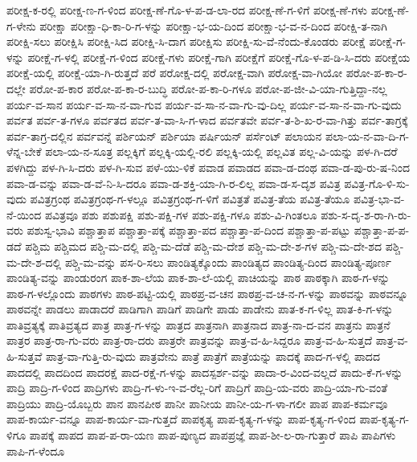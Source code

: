 {ಪರೀಕ್ಷ-ಕ-ರಲ್ಲಿ
ಪರೀಕ್ಷ-ಣ-ಗ-ಳಿಂದ
ಪರೀಕ್ಷ-ಣೆ-ಗೊ-ಳ-ಪ-ಡ-ಲಾ-ರದ
ಪರೀಕ್ಷ-ಣೆ-ಗ-ಳಿಗೆ
ಪರೀಕ್ಷ-ಣೆ-ಗಳು
ಪರೀಕ್ಷ-ಣೆ-ಗ-ಳೇನು
ಪರೀಕ್ಷಾ
ಪರೀಕ್ಷಾ-ಧಿ-ಕಾ-ರಿ-ಗ-ಳನ್ನು
ಪರೀಕ್ಷಾ-ಭ-ಯ-ದಿಂದ
ಪರೀಕ್ಷಾ-ಭ-ವ-ನ-ದಿಂದ
ಪರೀಕ್ಷಿ-ತ-ನಾಗಿ
ಪರೀಕ್ಷಿ-ಸಲು
ಪರೀಕ್ಷಿಸಿ
ಪರೀಕ್ಷಿ-ಸಿದ
ಪರೀಕ್ಷಿ-ಸಿ-ದಾಗ
ಪರೀಕ್ಷಿಸು
ಪರೀಕ್ಷಿ-ಸು-ವೆ-ನೆಂದು-ಕೊಂಡರು
ಪರೀಕ್ಷೆ
ಪರೀಕ್ಷೆ-ಗ-ಳನ್ನು
ಪರೀಕ್ಷೆ-ಗ-ಳಲ್ಲಿ
ಪರೀಕ್ಷೆ-ಗ-ಳಿಂದ
ಪರೀಕ್ಷೆ-ಗಳು
ಪರೀಕ್ಷೆ-ಗಾಗಿ
ಪರೀಕ್ಷೆಗೆ
ಪರೀಕ್ಷೆ-ಗೊ-ಳ-ಪ-ಡಿ-ಸಿ-ದರು
ಪರೀಕ್ಷೆಯ
ಪರೀಕ್ಷೆ-ಯಲ್ಲಿ
ಪರೀಕ್ಷೆ-ಯಾ-ಗಿ-ರುತ್ತದೆ
ಪರೆ
ಪರೋಕ್ಷ-ದಲ್ಲಿ
ಪರೋಕ್ಷ-ವಾಗಿ
ಪರೋಕ್ಷ-ವಾ-ಗಿಯೋ
ಪರೋ-ಪ-ಕಾ-ರ-ದಲ್ಲೇ
ಪರೋ-ಪ-ಕಾರ
ಪರೋ-ಪ-ಕಾ-ರ-ಬುದ್ಧಿ
ಪರೋ-ಪ-ಕಾ-ರಿ-ಗಳೂ
ಪರೋ-ಪ-ಜೀ-ವಿ-ಯಾ-ಗುತ್ತಿದ್ದಾ-ನಲ್ಲ
ಪರ್ಯ-ವ-ಸಾನ
ಪರ್ಯ-ವ-ಸಾ-ನ-ವಾ-ಗುವ
ಪರ್ಯ-ವ-ಸಾ-ನ-ವಾ-ಗು-ವು-ದಿಲ್ಲ
ಪರ್ಯ-ವ-ಸಾ-ನ-ವಾ-ಗು-ವುದು
ಪರ್ವತ
ಪರ್ವ-ತ-ಗಳೂ
ಪರ್ವತದ
ಪರ್ವ-ತ-ವಾ-ಸಿ-ಗ-ಳಾದ
ಪರ್ವತವೇ
ಪರ್ವ-ತ-ಶಿ-ಖ-ರ-ವಾ-ಗಿತ್ತು
ಪರ್ವ-ತಾಗ್ರಕ್ಕೆ
ಪರ್ವ-ತಾಗ್ರ-ದಲ್ಲಿನ
ಪರ್ವವನ್ನೆ
ಪರ್ಶಿಯನ್
ಪರ್ಶಿಯಾ
ಪರ್ಷಿಯನ್
ಪರ್ಸೆಂಟ್
ಪಲಾಯನ
ಪಲಾ-ಯ-ನ-ವಾ-ದಿ-ಗ-ಳೆನ್ನ-ಬೇಕೆ
ಪಲಾ-ಯ-ನ-ಸೂತ್ರ
ಪಲ್ಲಕ್ಕಿಗೆ
ಪಲ್ಲಕ್ಕಿ-ಯಲ್ಲಿ-ರಲಿ
ಪಲ್ಲಕ್ಕಿ-ಯಲ್ಲಿ
ಪಲ್ಲವಿತ
ಪಲ್ಲ-ವಿ-ಯನ್ನು
ಪಳ-ಗಿ-ದರೆ
ಪಳಗಿದ್ದು
ಪಳ-ಗಿ-ಸಿ-ದರು
ಪಳ-ಗಿ-ಸುವ
ಪಳೆ-ಯು-ಳಿಕೆ
ಪವಾಡ
ಪವಾಡದ
ಪವಾ-ಡ-ದಂಥ
ಪವಾ-ಡ-ಪು-ರು-ಷ-ನಿಂದ
ಪವಾ-ಡ-ವನ್ನು
ಪವಾ-ಡ-ವೆ-ನಿ-ಸಿ-ದರೂ
ಪವಾ-ಡ-ಶಕ್ತಿ-ಯಾ-ಗಿ-ರ-ಲಿಲ್ಲ
ಪವಾ-ಡ-ಸ-ದೃಶ
ಪವಿತ್ರ
ಪವಿತ್ರ-ಗೊ-ಳಿ-ಸು-ವುದು
ಪವಿತ್ರಗ್ರಂಥ
ಪವಿತ್ರಗ್ರಂಥ-ಗ-ಳಲ್ಲೂ
ಪವಿತ್ರಗ್ರಂಥ-ಗ-ಳಿಗೆ
ಪವಿತ್ರತೆ
ಪವಿತ್ರ-ತೆಯ
ಪವಿತ್ರ-ತೆಯೂ
ಪವಿತ್ರ-ಭಾ-ವ-ನೆ-ಯಿಂದ
ಪವಿತ್ರವೂ
ಪಶು
ಪಶುಪಕ್ಷಿ
ಪಶು-ಪಕ್ಷಿ-ಗಳ
ಪಶು-ಪಕ್ಷಿ-ಗಳೂ
ಪಶು-ವಿ-ಗಿಂತಲೂ
ಪಶು-ಸ-ದೃ-ಶ-ರಾ-ಗಿ-ರು-ವರು
ಪಶುಸ್ವ-ಭಾವಿ
ಪಶ್ಚಾತ್ತಾಪ
ಪಶ್ಚಾತ್ತಾ-ಪಕ್ಕೆ
ಪಶ್ಚಾತ್ತಾ-ಪದ
ಪಶ್ಚಾತ್ತಾ-ಪ-ದಿಂದ
ಪಶ್ಚಾತ್ತಾ-ಪ-ಪಟ್ಟು
ಪಶ್ಚಾತ್ತಾ-ಪ-ಪ-ಡದೆ
ಪಶ್ಚಿಮ
ಪಶ್ಚಿಮದ
ಪಶ್ಚಿ-ಮ-ದಲ್ಲಿ
ಪಶ್ಚಿ-ಮ-ದೆಡೆ
ಪಶ್ಚಿ-ಮ-ದೇಶ
ಪಶ್ಚಿ-ಮ-ದೇ-ಶ-ಗಳ
ಪಶ್ಚಿ-ಮ-ದೇ-ಶದ
ಪಶ್ಚಿ-ಮ-ದೇ-ಶ-ದಲ್ಲಿ
ಪಶ್ಚಿ-ಮ-ವನ್ನು
ಪಸ-ರಿ-ಸಲು
ಪಾಂಡಿತ್ಯಕ್ಕೊಂದು
ಪಾಂಡಿತ್ಯದ
ಪಾಂಡಿತ್ಯ-ದಿಂದ
ಪಾಂಡಿತ್ಯ-ಪೂರ್ಣ
ಪಾಂಡಿತ್ಯ-ವನ್ನು
ಪಾಂಡುರಂಗ
ಪಾಕ-ಶಾ-ಲೆಯ
ಪಾಕ-ಶಾ-ಲೆ-ಯಲ್ಲಿ
ಪಾಚಿಯನ್ನು
ಪಾಠ
ಪಾಠಕ್ಕಾಗಿ
ಪಾಠ-ಗ-ಳನ್ನು
ಪಾಠ-ಗ-ಳಲ್ಲೊಂದು
ಪಾಠಗಳು
ಪಾಠ-ಪಟ್ಟಿ-ಯಲ್ಲಿ
ಪಾಠಪ್ರ-ವ-ಚನ
ಪಾಠಪ್ರ-ವ-ಚ-ನ-ಗ-ಳನ್ನು
ಪಾಠವನ್ನು
ಪಾಠವನ್ನೂ
ಪಾಠವನ್ನೇ
ಪಾಡಲು
ಪಾಡಾದರೆ
ಪಾಡಿಗಾಗಿ
ಪಾಡಿಗೆ
ಪಾಡಿಗೇ
ಪಾಡು
ಪಾಡೇನು
ಪಾತ-ಕ-ಗ-ಳಿಲ್ಲ
ಪಾತ-ಕಿ-ಗ-ಳನ್ನು
ಪಾತಿವ್ರತ್ಯಕ್ಕೆ
ಪಾತಿವ್ರತ್ಯದ
ಪಾತ್ರ
ಪಾತ್ರ-ಗ-ಳನ್ನು
ಪಾತ್ರದ
ಪಾತ್ರನಾಗಿ
ಪಾತ್ರನಾದ
ಪಾತ್ರ-ನಾ-ದ-ವನ
ಪಾತ್ರನು
ಪಾತ್ರನೆ
ಪಾತ್ರರ
ಪಾತ್ರ-ರಾ-ಗು-ವರು
ಪಾತ್ರ-ರಾ-ದರು
ಪಾತ್ರರೇ
ಪಾತ್ರವನ್ನು
ಪಾತ್ರ-ವ-ಹಿ-ಸಿದ್ದರೂ
ಪಾತ್ರ-ವ-ಹಿ-ಸುತ್ತದೆ
ಪಾತ್ರ-ವ-ಹಿ-ಸುತ್ತವೆ
ಪಾತ್ರ-ವಾ-ಗುತ್ತಿ-ರು-ವುದು
ಪಾತ್ರವೇನು
ಪಾತ್ರೆ
ಪಾತ್ರೆಗೆ
ಪಾತ್ರೆಯನ್ನು
ಪಾದಕ್ಕೆ
ಪಾದ-ಗ-ಳಲ್ಲಿ
ಪಾದದ
ಪಾದದಲ್ಲಿ
ಪಾದದಿಂದ
ಪಾದರಕ್ಷೆ
ಪಾದ-ರಕ್ಷೆ-ಗ-ಳನ್ನು
ಪಾದಸ್ಪರ್ಶ-ವನ್ನು
ಪಾದಾ-ರ-ವಿಂದ-ವಲ್ಲದೆ
ಪಾದು-ಕೆ-ಗ-ಳನ್ನು
ಪಾದ್ರಿ
ಪಾದ್ರಿ-ಗ-ಳಿಂದ
ಪಾದ್ರಿಗಳು
ಪಾದ್ರಿ-ಗ-ಳು-ಇ-ವ-ರೆಲ್ಲ-ರಿಗೆ
ಪಾದ್ರಿಗೆ
ಪಾದ್ರಿ-ಯ-ವರು
ಪಾದ್ರಿ-ಯಾ-ಗು-ವಂತೆ
ಪಾದ್ರಿಯು
ಪಾದ್ರಿ-ಯೊಬ್ಬರು
ಪಾನ
ಪಾನಪೀಠ
ಪಾನೀ
ಪಾನೀಯ
ಪಾನೀ-ಯ-ಗ-ಳಾ-ಗಲೀ
ಪಾಪ
ಪಾಪ-ಕರ್ಮವೂ
ಪಾಪ-ಕಾರ್ಯ-ವನ್ನೂ
ಪಾಪ-ಕಾರ್ಯ-ವಾ-ಗುತ್ತದೆ
ಪಾಪಕೃತ್ಯ
ಪಾಪ-ಕೃತ್ಯ-ಗ-ಳನ್ನು
ಪಾಪ-ಕೃತ್ಯ-ಗ-ಳಿಂದ
ಪಾಪ-ಕೃತ್ಯ-ಗ-ಳಿಗೂ
ಪಾಪಕ್ಕೆ
ಪಾಪದ
ಪಾಪ-ಪ-ರಾ-ಯಣ
ಪಾಪ-ಪುಣ್ಯದ
ಪಾಪಪ್ರಜ್ಞೆ
ಪಾಪ-ಶೀ-ಲ-ರಾ-ಗುತ್ತಾರೆ
ಪಾಪಿ
ಪಾಪಿಗಳು
ಪಾಪಿ-ಗ-ಳೆಂದೂ
}
